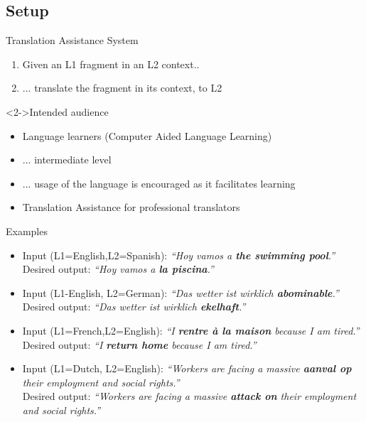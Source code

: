 \documentclass[compress]{beamer}
\begin{document}
\subsection{Setup}
\begin{frame}

  \begin{block}{Translation Assistance System}
    \begin{enumerate}
      \item Given an L1 fragment in an L2 context..
      \item ... translate the fragment in its context, to L2
    \end{enumerate}
  \end{block}

  \begin{block}<2->{Intended audience}
    \begin{itemize}
      \item<2-> Language learners (Computer Aided Language Learning)
      \item<2-> ...  intermediate level
      \item<2-> ...  usage of the language is encouraged as it facilitates learning
      \item<2-> Translation Assistance for professional translators
    \end{itemize}
  \end{block}


\end{frame}


\begin{frame}{Examples}

{\footnotesize
  \begin{itemize}
    \item 
      Input (L1=English,L2=Spanish): \emph{“Hoy vamos a \textbf{the swimming
      pool}.”} \\
      Desired output: \emph{“Hoy vamos a \textbf{la piscina}.”}
    \item
      Input (L1-English, L2=German): \emph{“Das wetter ist wirklich
      \textbf{abominable}.”} \\
      Desired output: \emph{“Das wetter ist wirklich \textbf{ekelhaft}.”}
    \item
      Input (L1=French,L2=English): \emph{“I \textbf{rentre \`a la maison} because
      I am tired.”} \\
      Desired output: \emph{“I \textbf{return home} because I am tired.”}
    \item
      Input (L1=Dutch, L2=English): \emph{“Workers are facing a massive \textbf{aanval
      op} their employment and social rights.”} \\
      Desired output: \emph{“Workers are facing a massive \textbf{attack on}
      their employment and social rights.”}
  \end{itemize}
}

\end{frame}
\end{document}
